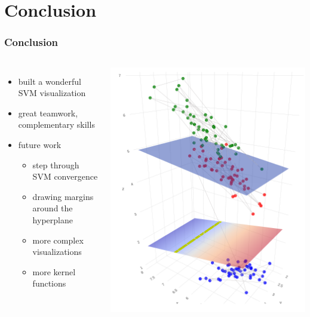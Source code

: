 \documentclass[english,hangout]{beamer}
\begin{document}
\section{Conclusion}
\begin{frame}
	\frametitle{Conclusion}

  \begin{columns}
  \begin{itemize}
  \item built a wonderful SVM visualization
  \item great teamwork,\\complementary skills
  \item future work
    \begin{itemize}
    \item step through SVM convergence
    \item drawing margins around the hyperplane
    \item more complex visualizations
    \item more kernel functions
    \end{itemize}
  \end{itemize}
  \begin{center}
    \includegraphics[width=\textwidth]{3dplot}
  \end{center}
  \end{columns}
  
\end{frame}
\end{document}
